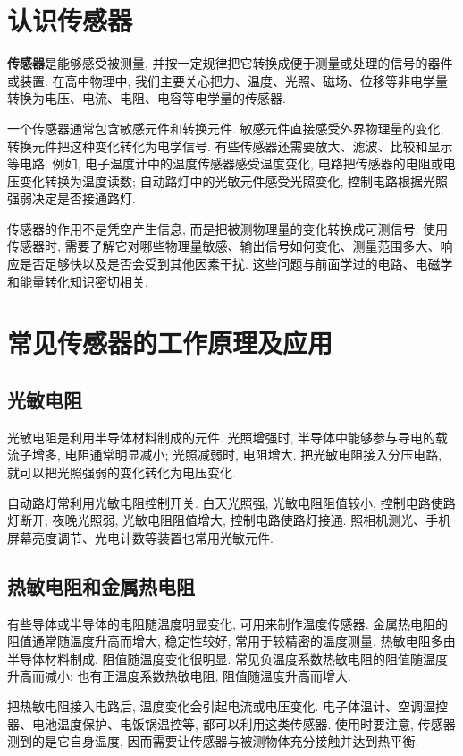 \documentclass[11pt,a4paper]{ctexbook}
\begin{document}
\section{认识传感器}

\textbf{传感器}是能够感受被测量, 并按一定规律把它转换成便于测量或处理的信号的器件或装置.
在高中物理中, 我们主要关心把力、温度、光照、磁场、位移等非电学量转换为电压、电流、电阻、电容等电学量的传感器.

一个传感器通常包含敏感元件和转换元件. 敏感元件直接感受外界物理量的变化, 转换元件把这种变化转化为电学信号.
有些传感器还需要放大、滤波、比较和显示等电路. 例如, 电子温度计中的温度传感器感受温度变化,
电路把传感器的电阻或电压变化转换为温度读数; 自动路灯中的光敏元件感受光照变化,
控制电路根据光照强弱决定是否接通路灯.

传感器的作用不是凭空产生信息, 而是把被测物理量的变化转换成可测信号. 使用传感器时,
需要了解它对哪些物理量敏感、输出信号如何变化、测量范围多大、响应是否足够快以及是否会受到其他因素干扰.
这些问题与前面学过的电路、电磁学和能量转化知识密切相关.

\section{常见传感器的工作原理及应用}

\subsection{光敏电阻}

光敏电阻是利用半导体材料制成的元件. 光照增强时, 半导体中能够参与导电的载流子增多,
电阻通常明显减小; 光照减弱时, 电阻增大. 把光敏电阻接入分压电路, 就可以把光照强弱的变化转化为电压变化.

自动路灯常利用光敏电阻控制开关. 白天光照强, 光敏电阻阻值较小, 控制电路使路灯断开;
夜晚光照弱, 光敏电阻阻值增大, 控制电路使路灯接通. 照相机测光、手机屏幕亮度调节、光电计数等装置也常用光敏元件.

\subsection{热敏电阻和金属热电阻}

有些导体或半导体的电阻随温度明显变化, 可用来制作温度传感器. 金属热电阻的阻值通常随温度升高而增大,
稳定性较好, 常用于较精密的温度测量. 热敏电阻多由半导体材料制成, 阻值随温度变化很明显.
常见负温度系数热敏电阻的阻值随温度升高而减小; 也有正温度系数热敏电阻, 阻值随温度升高而增大.

把热敏电阻接入电路后, 温度变化会引起电流或电压变化. 电子体温计、空调温控器、电池温度保护、电饭锅温控等,
都可以利用这类传感器. 使用时要注意, 传感器测到的是它自身温度, 因而需要让传感器与被测物体充分接触并达到热平衡.
\end{document}
